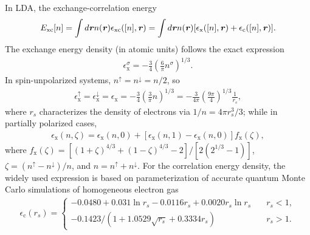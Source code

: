 In LDA, the exchange-correlation energy 
\begin{equation}\label{spExclda}
\begin{aligned}
E_\text{xc}[n]
=\int d\textbf{\textit r} n(\textbf{\textit r})\epsilon_\text{xc}([n],\textbf{\textit r})
=\int d\textbf{\textit r} n(\textbf{\textit r})[\epsilon_\text{x}([n],\textbf{\textit r})+\epsilon_\text{c}([n],\textbf{\textit r})].
\end{aligned}
\end{equation}
The exchange energy density (in atomic units) follows the exact expression \cite{martin-esbook}
\begin{equation}\label{ldaxs1}
\begin{aligned}
\epsilon_\text{x}^\sigma=-\frac{3}{4}\left(\frac{6}{\pi}n^\sigma\right)^{1/3}.
\end{aligned}
\end{equation}
In spin-unpolarized systems, $n^\uparrow=n^\downarrow=n/2$, so
\begin{equation}\label{ldaxs0}
\begin{aligned}
\epsilon_\text{x}^\uparrow=\epsilon_\text{x}^\downarrow=\epsilon_\text{x}
=-\frac{3}{4}\left(\frac{3}{\pi}n\right)^{1/3}
=-\frac{3}{4\pi}\left(\frac{9\pi}{4}\right)^{1/3}\frac{1}{r_s},
\end{aligned}
\end{equation}
where $r_s$ characterizes the density of electrons via $1/n=4\pi r_s^3/3$; 
while in partially polarized cases,
\begin{equation}\label{ldaxs2}
\begin{aligned}
\epsilon_\text{x}(n,\zeta)=\epsilon_\text{x}(n,0)+[\epsilon_\text{x}(n,1)-\epsilon_\text{x}(n,0)]f_\text{x}(\zeta),
\end{aligned}
\end{equation}
where $f_\text{x}(\zeta)=[(1+\zeta)^{4/3}+(1-\zeta)^{4/3}-2]/[2(2^{1/3}-1)]$,
$\zeta=(n^\uparrow-n^\downarrow)/n$, and $n=n^\uparrow+n^\downarrow$. For the
correlation energy density, the widely used expression is based on parameterization
\cite{Perdew1981} of accurate quantum Monte Carlo simulations of homogeneous electron gas \cite{Ceperley1980}
\begin{equation}\label{ldaccapz}
\begin{aligned}
\epsilon_\text{c}(r_s)=
\begin{cases}
-0.0480 + 0.031 \ln r_s - 0.0116r_s + 0.0020 r_s\ln r_s & \quad r_s < 1, \\
-0.1423/(1+1.0529\sqrt{r_s}+0.3334r_s) & \quad r_s > 1.
\end{cases}
\end{aligned}
\end{equation}

